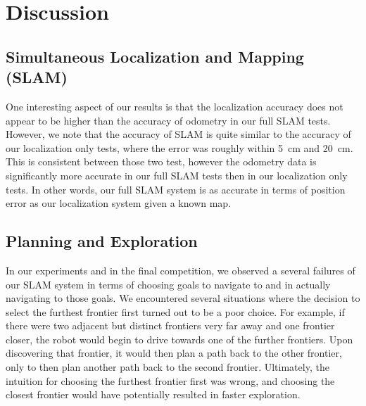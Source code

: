 \documentclass[journal]{IEEEtran}
\begin{document}
            
\section{Discussion}

    \subsection{Simultaneous Localization and Mapping (SLAM)}
    
        One interesting aspect of our results is that the localization accuracy does not appear to be higher than the accuracy of odometry in our full SLAM tests. However, we note that the accuracy of SLAM is quite similar to the accuracy of our localization only tests, where the error was roughly within \SI{5}{\centi\meter} and \SI{20}{\centi\meter}. This is consistent between those two test, however the odometry data is significantly more accurate in our full SLAM tests then in our localization only tests. In other words, our full SLAM system is as accurate in terms of position error as our localization system given a known map.

    \subsection{Planning and Exploration}
    
        In our experiments and in the final competition, we observed a several failures of our SLAM system in terms of choosing goals to navigate to and in actually navigating to those goals. We encountered several situations where the decision to select the furthest frontier first turned out to be a poor choice. For example, if there were two adjacent but distinct frontiers very far away and one frontier closer, the robot would begin to drive towards one of the further frontiers. Upon discovering that frontier, it would then plan a path back to the other frontier, only to then plan another path back to the second frontier. Ultimately, the intuition for choosing the furthest frontier first was wrong, and choosing the closest frontier would have potentially resulted in faster exploration.
\end{document}
